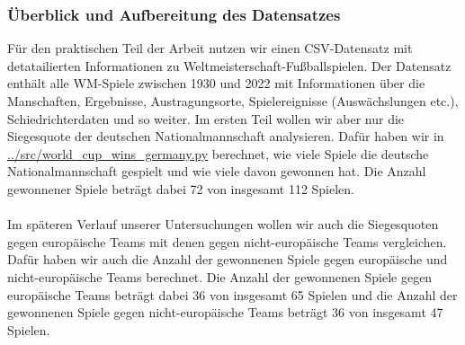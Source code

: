 \documentclass[a4paper,12pt]{article}
\begin{document}
\subsubsection{Überblick und Aufbereitung des Datensatzes}
Für den praktischen Teil der Arbeit nutzen wir einen CSV-Datensatz mit detatailierten Informationen zu Weltmeisterschaft-Fußballspielen. Der Datensatz enthält alle WM-Spiele zwischen 1930 und 2022 mit Informationen über die Manschaften, Ergebnisse, Austragungsorte, Spielereignisse (Auswächslungen etc.), Schiedrichterdaten und so weiter. Im ersten Teil wollen wir aber nur die Siegesquote der deutschen Nationalmannschaft analysieren. Dafür haben wir in \url{../src/world_cup_wins_germany.py} berechnet, wie viele Spiele die deutsche Nationalmannschaft gespielt und wie viele davon gewonnen hat. Die Anzahl gewonnener Spiele beträgt dabei 72 von insgesamt 112 Spielen. \\\\
Im späteren Verlauf unserer Untersuchungen wollen wir auch die Siegesquoten gegen europäische Teams mit denen gegen nicht-europäische Teams vergleichen. Dafür haben wir auch die Anzahl der gewonnenen Spiele gegen europäische und nicht-europäische Teams berechnet. Die Anzahl der gewonnenen Spiele gegen europäische Teams beträgt dabei 36 von insgesamt 65 Spielen und die Anzahl der gewonnenen Spiele gegen nicht-europäische Teams beträgt 36 von insgesamt 47 Spielen. \\\\
\end{document}
